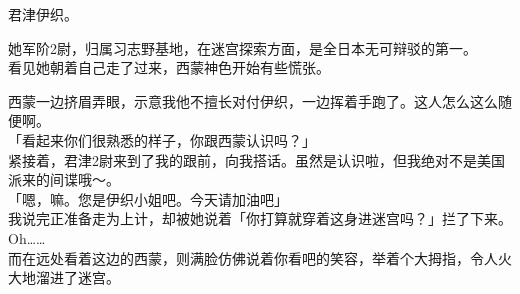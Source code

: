 君津伊织。

她军阶2尉，归属习志野基地，在迷宫探索方面，是全日本无可辩驳的第一。\\

看见她朝着自己走了过来，西蒙神色开始有些慌张。


西蒙一边挤眉弄眼，示意我他不擅长对付伊织，一边挥着手跑了。这人怎么这么随便啊。\\

「看起来你们很熟悉的样子，你跟西蒙认识吗？」\\

紧接着，君津2尉来到了我的跟前，向我搭话。虽然是认识啦，但我绝对不是美国派来的间谍哦～。\\

「嗯，嘛。您是伊织小姐吧。今天请加油吧」\\

我说完正准备走为上计，却被她说着「你打算就穿着这身进迷宫吗？」拦了下来。Oh……\\

而在远处看着这边的西蒙，则满脸仿佛说着你看吧的笑容，举着个大拇指，令人火大地溜进了迷宫。\\
